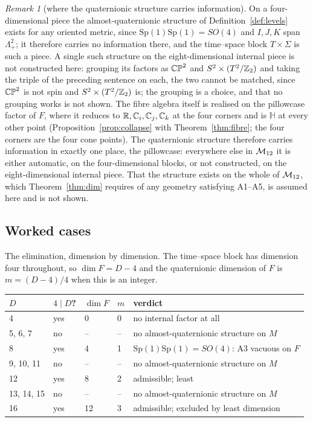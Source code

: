 \documentclass[11pt,a4paper]{article}
\theoremstyle{plain}
\theoremstyle{definition}
\theoremstyle{remark}
\newtheorem{remark}[theorem]{Remark}
\newcommand{\Hquat}{\mathbb{H}}
\begin{document}
\begin{remark}[where the quaternionic structure carries information]\label{rem:whereH}
On a four-dimensional piece the almost-quaternionic structure of Definition~\ref{def:levels} exists for any oriented metric, since $\mathrm{Sp}(1)\mathrm{Sp}(1)=SO(4)$ and $I,J,K$ span $\Lambda^{2}_{+}$; it therefore carries no information there, and the time--space block $T\times\Sigma$ is such a piece. A single such structure on the eight-dimensional internal piece is not constructed here: grouping its factors as $\mathbb{CP}^2$ and $S^2\times(T^2/\mathbb{Z}_2)$ and taking the triple of the preceding sentence on each, the two cannot be matched, since $\mathbb{CP}^2$ is not spin and $S^2\times(T^2/\mathbb{Z}_2)$ is; the grouping is a choice, and that no grouping works is not shown. The fibre algebra itself is realised on the pillowcase factor of $F$, where it reduces to $\mathbb{R},\mathbb{C}_{i},\mathbb{C}_{j},\mathbb{C}_{k}$ at the four corners and is $\Hquat$ at every other point (Proposition~\ref{prop:collapse} with Theorem~\ref{thm:fibre}; the four corners are the four cone points). The quaternionic structure therefore carries information in exactly one place, the pillowcase: everywhere else in $\mathcal{M}_{12}$ it is either automatic, on the four-dimensional blocks, or not constructed, on the eight-dimensional internal piece. That the structure exists on the whole of $\mathcal{M}_{12}$, which Theorem~\ref{thm:dim} requires of any geometry satisfying A1--A5, is assumed here and is not shown.
\end{remark}

\subsection{Worked cases}\label{sec:dim-worked}

The elimination, dimension by dimension. The time--space block has dimension four throughout, so $\dim F=D-4$ and the quaternionic dimension of $F$ is $m=(D-4)/4$ when this is an integer.

\begin{center}
\begin{tabular}{lllll}
\toprule
$D$ & $4\mid D$? & $\dim F$ & $m$ & verdict\\
\midrule
4 & yes & 0 & 0 & no internal factor at all\\
5, 6, 7 & no & -- & -- & no almost-quaternionic structure on $M$\\
8 & yes & 4 & 1 & $\mathrm{Sp}(1)\mathrm{Sp}(1)=SO(4)$: A3 vacuous on $F$\\
9, 10, 11 & no & -- & -- & no almost-quaternionic structure on $M$\\
12 & yes & 8 & 2 & admissible; least\\
13, 14, 15 & no & -- & -- & no almost-quaternionic structure on $M$\\
16 & yes & 12 & 3 & admissible; excluded by least dimension\\
\bottomrule
\end{tabular}
\end{center}
\end{document}
